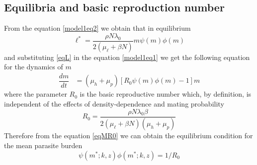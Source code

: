\documentclass[12pt,a4paper]{article}
\theoremstyle{plain}%
\theoremstyle{definition}
\theoremstyle{remark}
\begin{document}
%	

\subsection{Equilibria and basic reproduction number}
	From the equation \eqref{model1eq2} we obtain that in equilibrium
	\begin{equation}\label{eqL}
		\ell^*=\frac{\rho N \lambda_0}{2(\mu_{\ell}+\beta N)} m \psi(m)\phi(m) 
	\end{equation} 
	and substituting \eqref{eqL} in the equation \eqref{model1eq1} we get the following equation for the dynamics of $m$
	\begin{align}\label{eqMR0}
		\dfrac{dm}{dt}&=(\mu_h + \mu_p)\left[ R_0  \psi(m)\phi(m) -1 \right] m%
	\end{align}
	where the parameter $R_0$ is the basic reproductive number which, by definition, is independent of the effects of density-dependence and  mating probability
	\begin{equation}\label{valorR0}
	R_0=\frac{ \rho N \lambda_0 \beta}{2 (\mu_{\ell}+\beta N) (\mu_h + \mu_p) }
	\end{equation}
	Therefore from the equation \eqref{eqMR0} we can obtain the equilibrium condition for the mean parasite burden
	\begin{equation}\label{eqequilibrio}
	\psi(m^*;k,z)\phi(m^*;k,z)=1/R_0
	\end{equation}
	
\end{document}
